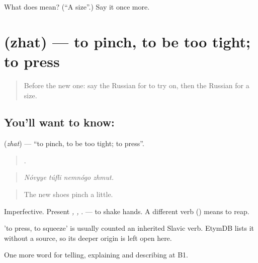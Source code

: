 \begin{tcolorbox}[breakable,colback=teal!4,colframe=teal!35!black,title={Before you move on}]
What does  mean? (\textquotedblleft{}A size\textquotedblright{}.) Say it once more.
\end{tcolorbox}
\section[\texorpdfstring{\ru{жать} (zhat)}{жать (zhat)}]{ (zhat) — to pinch, to be too tight; to press}

\label{lesson:RU-C453-zhat}



\begin{quote}
Before the new one: say the Russian for to try on, then the Russian for a size.
\end{quote}

\subsection*{You'll want to know: }
\textbf{} (\emph{zhat}) — \textquotedblleft{}to pinch, to be too tight; to press\textquotedblright{}.

\begin{quote}
   .
\end{quote}

\begin{quote}
\emph{Nóvyye túfli nemnógo zhmut.}
\end{quote}

\begin{quote}
The new shoes pinch a little.
\end{quote}

Imperfective. Present \emph{, , }. \emph{ } — to shake hands. A different verb \emph{} (\emph{}) means to reap.

\begin{cousinweb}
\emph{} 'to press, to squeeze' is usually counted an inherited Slavic verb. EtymDB lists it without a source, so its deeper origin is left open here.
\end{cousinweb}

\begin{grammarlens}[title={What you've built}]
One more word for telling, explaining and describing at B1.
\end{grammarlens}

